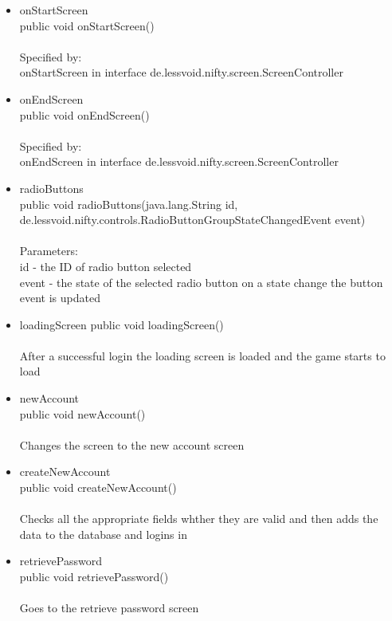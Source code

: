 \documentclass[letterpaper]{article}
\begin{document}
\begin{itemize}
\begin{itemize}
										\item	onStartScreen \\
												public void onStartScreen() \\ \\
												Specified by: \\
												onStartScreen in interface de.lessvoid.nifty.screen.ScreenController
										\item	onEndScreen \\
												public void onEndScreen() \\ \\
												Specified by: \\
												onEndScreen in interface de.lessvoid.nifty.screen.ScreenController
										\item	radioButtons \\
												public void radioButtons(java.lang.String id, de.lessvoid.nifty.controls.RadioButtonGroupStateChangedEvent event) \\ \\
												Parameters: \\
												id - the ID of radio button selected \\
												event - the state of the selected radio button on a state change the button event is updated
										\item	loadingScreen
												public void loadingScreen() \\ \\
												After a successful login the loading screen is loaded and the game starts to load
										\item	newAccount \\
												public void newAccount() \\ \\
												Changes the screen to the new account screen
										\item	createNewAccount \\
												public void createNewAccount() \\ \\
												Checks all the appropriate fields whther they are valid and then adds the data to the database and logins in
										\item	retrievePassword \\
												public void retrievePassword() \\ \\
												Goes to the retrieve password screen

\end{itemize}
\end{itemize}
\end{document}
